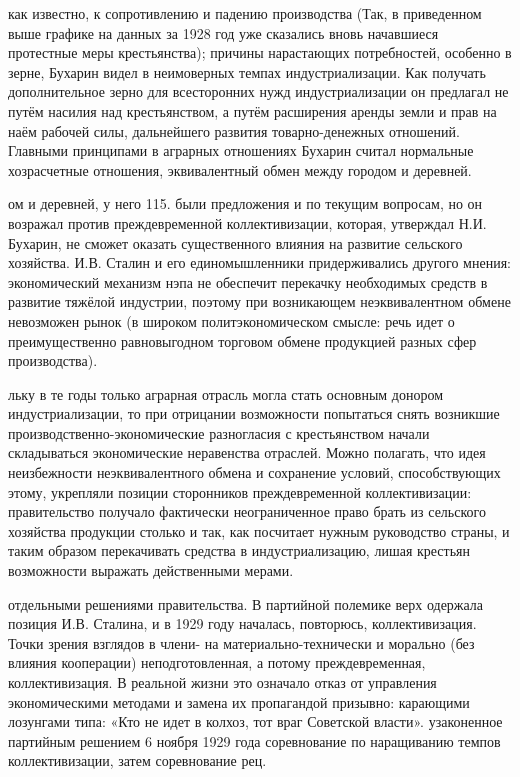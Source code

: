 \label{112-1}
как известно, к сопротивлению и падению производства (Так, в приведенном выше графике на данных за 1928 год уже сказались вновь начавшиеся протестные меры крестьянства); причины нарастающих потребностей, особенно в зерне, Бухарин видел в неимоверных темпах индустриализации. Как получать дополнительное зерно для всесторонних нужд индустриализации он предлагал не путём насилия над крестьянством, а путём расширения аренды земли и прав на наём рабочей силы, дальнейшего развития товарно-денежных отношений. Главными принципами в аграрных отношениях Бухарин считал нормальные хозрасчетные отношения, эквивалентный обмен между городом и деревней.

\label{113-1}
ом и деревней, у него 115. были предложения и по текущим вопросам, но он возражал против преждевременной коллективизации, которая, утверждал Н.И. Бухарин, не сможет оказать существенного влияния на развитие сельского хозяйства. И.В. Сталин и его единомышленники придерживались другого мнения: экономический механизм нэпа не обеспечит перекачку необходимых средств в развитие тяжёлой индустрии, поэтому при возникающем неэквивалентном обмене невозможен рынок (в широком политэкономическом смысле: речь идет о преимущественно равновыгодном торговом обмене продукцией разных сфер производства).

\label{114-1}
льку в те годы только аграрная отрасль могла стать основным донором индустриализации, то при отрицании возможности попытаться снять возникшие производственно-экономические разногласия с крестьянством начали складываться экономические неравенства отраслей. Можно полагать, что идея неизбежности неэквивалентного обмена и сохранение условий, способствующих этому, укрепляли позиции сторонников преждевременной коллективизации: правительство получало фактически неограниченное право брать из сельского хозяйства продукции столько и так, как посчитает нужным руководство страны, и таким образом перекачивать средства в индустриализацию, лишая крестьян возможности выражать действенными мерами.

\label{115-1}
отдельными решениями правительства. В партийной полемике верх одержала позиция И.В. Сталина, и в 1929 году началась, повторюсь, коллективизация. Точки зрения взглядов в члени- на материально-технически и морально (без влияния кооперации) неподготовленная, а потому преждевременная, коллективизация. В реальной жизни это означало отказ от управления экономическими методами и замена их пропагандой призывно: карающими лозунгами типа: «Кто не идет в колхоз, тот враг Советской власти». узаконенное партийным решением 6 ноября 1929 года соревнование по наращиванию темпов коллективизации, затем соревнование рец.

